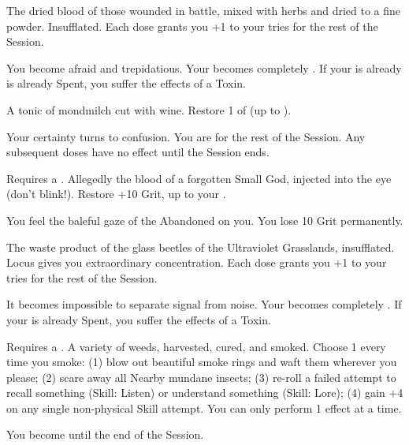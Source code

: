     The dried blood of those wounded in battle, mixed with herbs and dried to a fine powder.  Insufflated. Each dose grants you +1 to your \VIG tries for the rest of the Session.

     You become afraid and trepidatious. Your \PRE becomes completely . If your \PRE is already is already Spent, you suffer the effects of a  Toxin.


   A tonic of mondmilch cut with wine. Restore 1 \UD of \CLR (up to \MAX).

   Your certainty turns to confusion. You are  for the rest of the Session. Any subsequent doses have no effect until the Session ends.



  Requires a . Allegedly the blood of a forgotten Small God, injected into the eye (don't blink!). Restore +10 Grit, up to your \MAX.

   You feel the baleful gaze of the Abandoned on you. You lose 10 Grit permanently.




  The waste product of the glass beetles of the Ultraviolet Grasslands, insufflated.  Locus gives you extraordinary concentration.  Each dose grants you +1 to your \FOC tries for the rest of the Session.

    It becomes impossible to separate signal from noise.   Your \CLR becomes completely . If your \CLR is already Spent, you suffer the effects of a  Toxin.



  Requires a . A variety of weeds, harvested, cured, and smoked. Choose 1 every time you smoke: (1) blow out beautiful smoke rings and waft them wherever you please; (2) scare away all Nearby mundane insects; (3) re-roll a failed attempt to recall something (Skill: Listen) or understand something (Skill: Lore); (4) gain +4 on any single non-physical Skill \RO attempt.  You can only perform 1 effect at a time.  

   You become  until the end of the Session.

